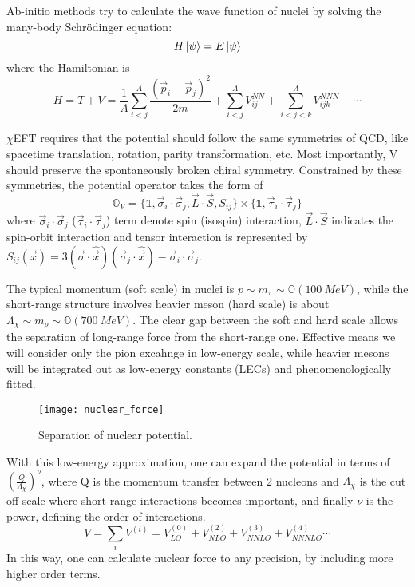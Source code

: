
Ab-initio methods try to calculate the wave function of nuclei by solving the
many-body Schr\"{o}dinger equation:
\begin{equation}
    H\ket{\psi} = E\ket{\psi}
\end{equation}
where the Hamiltonian is
\begin{equation}
    H = T + V = \frac{1}{A} \sum_{i<j}^A \frac{(\vec{p}_i - \vec{p}_j)^2}{2m} 
	+ \sum_{i<j}^A V_{ij}^{NN} + \sum_{i<j<k}^A V_{ijk}^{NNN} + \cdots
\end{equation}

$\chi$EFT requires that the potential should follow the same symmetries of QCD,
like spacetime translation, rotation, parity transformation, etc. Most importantly, V should
preserve the spontaneously broken chiral symmetry. Constrained by these symmetries,
the potential operator takes the form of
\begin{equation}
    \mathds{O}_V = \{\mathds{1}, \vec{\sigma}_i \cdot \vec{\sigma}_j, \vec{L} \cdot \vec{S}, S_{ij}\} 
	\times \{\mathds{1}, \vec{\tau}_i \cdot \vec{\tau}_j\}
\end{equation}
where $\vec{\sigma}_i \cdot \vec{\sigma}_j$ ($\vec{\tau}_i \cdot \vec{\tau}_j$) term
denote spin (isospin) interaction, 
$\vec{L} \cdot \vec{S}$ indicates the spin-orbit interaction and tensor interaction
is represented by 
$S_{ij}(\vec{x}) = 3(\vec{\sigma} \cdot \hat{\vec{x}})(\vec{\sigma}_j \cdot \hat{\vec{x}}) - \vec{\sigma}_i \cdot \vec{\sigma}_j$.

The typical momentum (soft scale) in nuclei is $p \sim m_\pi \sim \mathds{O}(100\ MeV)$, while the
short-range structure involves heavier meson (hard scale) is about 
$\Lambda_\chi \sim m_\rho \sim \mathds{O}(700 \ MeV)$. 
The clear gap between the soft and hard scale allows the separation of long-range force 
from the short-range one. Effective means we will consider only the pion excahnge
in low-energy scale, while heavier mesons will be integrated out as low-energy
constants (LECs) and phenomenologically fitted. 
\begin{figure}[H]
    \centering
    \texttt{[image: nuclear\_force]}
    \caption{Separation of nuclear potential.}
\end{figure}
With this low-energy approximation, one can expand the potential in terms of
$\left(\frac{Q}{\Lambda_\chi}\right)^\nu$, where Q is the momentum transfer
between 2 nucleons and $\Lambda_\chi$ is the cut off scale where short-range 
interactions becomes important, and
finally $\nu$ is the power, defining the order of interactions. 
\begin{equation}
    V = \sum_i V^{(i)} = V^{(0)}_{LO} + V^{(2)}_{NLO} + V^{(3)}_{NNLO} + V^{(4)}_{NNNLO} \cdots
\end{equation}
In this way, one can calculate nuclear force to any precision, by including
more higher order terms.


